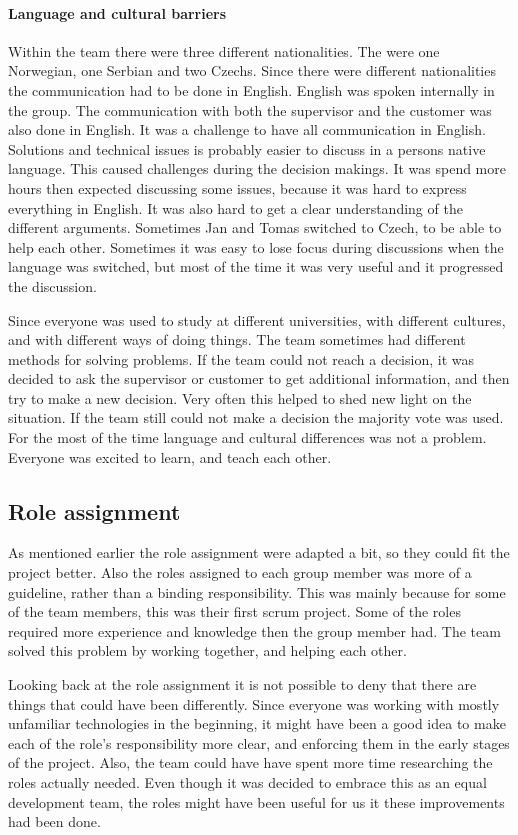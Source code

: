 \paragraph{Language and cultural barriers}

Within the team there were three different nationalities. The were one Norwegian, one Serbian and two Czechs. Since there were different nationalities the communication had to be done in English. English was spoken internally in the group. The communication with both the supervisor and the customer
was also done in English. It was a challenge to have all communication in English. Solutions and technical issues is probably easier to discuss in a persons native language. This caused challenges during the decision makings. It was spend more hours then expected discussing some issues, because it was hard to express everything in English. It was also hard to get a clear understanding of the different arguments. Sometimes Jan and Tomas switched to Czech, to be able to help each other. Sometimes it was easy to lose focus during discussions when the language was switched, but most of the time it was very useful and it progressed the discussion.

Since everyone was used to study at different universities, with different cultures, and with different ways of doing things. The team sometimes had different methods for solving problems. If the team could not reach a decision, it was decided to ask the supervisor or customer to get additional information, and then try to make a new decision. Very often this helped to shed new light on the situation. If the team still could not make a decision the majority vote was used. For the most of the time language and cultural differences was not a problem. Everyone was excited to learn, and teach each other. 

\subsection{Role assignment}
As mentioned earlier the role assignment were adapted a bit, so they could fit the project better. Also the roles assigned to each group member was more of a guideline, rather than a binding responsibility. This was mainly because for some of the team members, this was their first scrum project. Some of the roles required more experience and knowledge then the group member had. The team solved this problem by working together, and helping each other. 

Looking back at the role assignment it is not possible to deny that there are things that could have been differently. Since everyone was working with mostly unfamiliar technologies in the beginning, it might have been a good idea to make each of the role's responsibility more clear, and enforcing them in the early stages of the project. Also, the team could have have spent more time researching the roles actually needed. Even though it was decided to embrace this as an equal development team, the roles might have been useful for us it these improvements had been done. 

